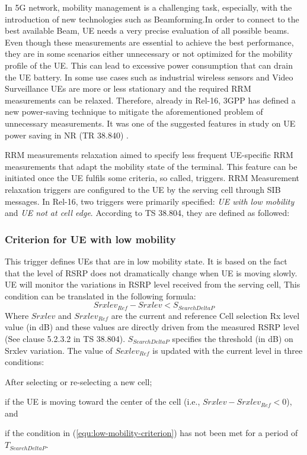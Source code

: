 \documentclass[conference]{IEEEtran}
\begin{document}
In 5G network, mobility management is a challenging task, especially, with the introduction of new technologies such as Beamforming.In order to connect to the best available Beam, UE needs a very precise evaluation of all possible beams. Even though these measurements are essential to achieve the best performance, they are in some scenarios either unnecessary or not optimized for the mobility profile of the UE. This can lead to excessive power consumption that can drain the UE battery. In some use cases such as industrial wireless sensors and Video Surveillance UEs are more or less stationary and the required RRM measurements can be relaxed.
Therefore, already in Rel-16, 3GPP has defined a new power-saving technique to mitigate the aforementioned problem of unnecessary measurements. It was one of the suggested features in study on UE power saving in NR (TR 38.840) \cite{3gpp.38.840}.

 RRM measurements relaxation aimed to specify less frequent UE-specific RRM measurements that adapt the mobility state of the terminal. This feature can be initiated once the UE fulfils some criteria, so called, triggers. RRM Measurement relaxation triggers are configured to the UE by the serving cell through SIB messages. In Rel-16, two triggers were primarily specified: \textit{UE with low mobility} and \textit{UE not at cell edge}. According to TS 38.804, they are defined as followed:\\

\subsubsection*{\textbf{Criterion for UE with low mobility}} This trigger defines UEs that are in low mobility state. It is based on the fact that the level of RSRP does not dramatically change when UE is moving slowly. UE will monitor the variations in RSRP level received from the serving cell, This condition can be translated in the following formula:
\begin{equation}
Srxlev_{Ref}-Srxlev<S_{SearchDeltaP}
\label{equ:low-mobility-criterion}
\end{equation}
Where $Srxlev$ and $Srxlev_{Ref}$ are the current and reference Cell selection Rx level value (in dB) and these values are directly driven from the measured RSRP level (See clause 5.2.3.2 in TS 38.804). $S_{SearchDeltaP}$ specifies the threshold (in dB) on Srxlev variation. The value of $Sexlev_{Ref}$ is updated with the current level in three conditions:
\begin{enumerate*}
    \item After selecting or re-selecting a new cell;
    \item if the UE is moving toward the center of the cell (i.e., $Srxlev-Srxlev_{Ref}<0$), and
    \item if the condition in (\ref{equ:low-mobility-criterion}) has not been met for a period of $T_{SearchDeltaP}$.
\end{enumerate*}
\end{document}
